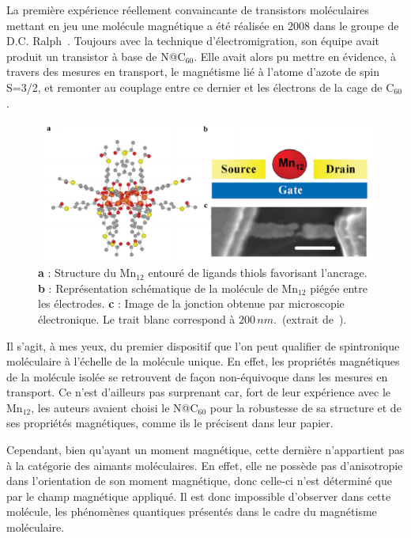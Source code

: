 La première expérience réellement convaincante de transistors moléculaires mettant en jeu une molécule magnétique a été réalisée en 2008 dans le groupe de D.C. Ralph~\cite{Grose2008}. Toujours avec la technique d'électromigration, son équipe avait produit un transistor à base de N@C$_{60}$. Elle avait alors pu mettre en évidence, à travers des mesures en transport, le magnétisme lié à l'atome d'azote de spin S=3/2,  et remonter au couplage entre ce dernier et les électrons de la cage de C$_{60}$. 

\begin{figure}
\centering \includegraphics[scale=0.45]{Spintronique/MolSpintro/MolSpintro.pdf}
\caption{\textbf{a} : Structure du Mn$_{12}$ entouré de ligands thiols favorisant l'ancrage. \textbf{b} : Représentation schématique de la molécule de Mn$_{12}$ piégée entre les électrodes. \textbf{c} : Image de la jonction obtenue par microscopie électronique. Le trait blanc correspond à $200\,nm$.~(extrait de~\cite{Heersche2006}).}
\label{MolSpintro}
\end{figure}

Il s'agit, à mes yeux, du premier dispositif que l'on peut qualifier de spintronique moléculaire à l'échelle de la molécule unique. En effet, les propriétés magnétiques de la molécule isolée se retrouvent de façon non-équivoque dans les mesures en transport. Ce n'est d'ailleurs pas surprenant car, fort de leur expérience avec le Mn$_{12}$, les auteurs avaient choisi le N@C$_{60}$ pour la robustesse de sa structure et de ses propriétés magnétiques, comme ils le précisent dans leur papier. 

Cependant, bien qu'ayant un moment magnétique, cette dernière n'appartient pas à la catégorie des aimants moléculaires. En effet, elle ne possède pas d'anisotropie dans l'orientation de son moment magnétique, donc celle-ci n'est déterminé que par le champ magnétique appliqué. Il est donc impossible d'observer dans cette molécule, les phénomènes quantiques présentés dans le cadre du magnétisme moléculaire.

